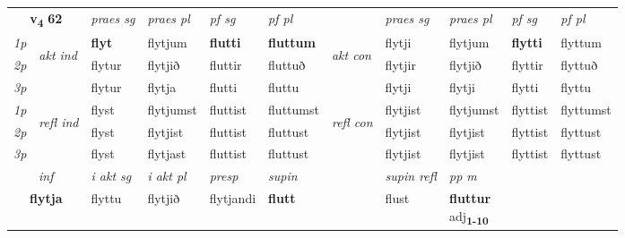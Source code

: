\noindent
\begin{tabular}{lllllllllll} \toprule
\multicolumn{2}{c}{\textbf{v{\textsubscript{4}}} \Large{\textbf{62}}}  &  \textit{praes sg}  & \textit{praes pl}  &\textit{ pf sg} & \textit{pf pl} &  &  \textit{praes sg}  & \textit{praes pl}  & \textit{pf sg} & \textit{pf pl } \\*
	\cmidrule{3-6} \cmidrule{8-11}
 {\textit{1p}} & \multirow{3}{*}{\begin{turn}{90}\textit{akt ind}\end{turn}} & \textbf{flyt} & flytjum & \textbf{flutti} & \textbf{fluttum} & \multirow{3}{*}{\begin{turn}{90}\textit{akt con}\end{turn}} &flytji & flytjum & \textbf{flytti} & flyttum\\*
 {\textit{2p}} &  &  flytur  & flytjið & fluttir & fluttuð & & flytjir & flytjið & flyttir & flyttuð \\*
{\textit{3p}} &  & flytur & flytja & flutti & fluttu & & flytji & flytji& flytti & flyttu \\*
\cmidrule{3-6} \cmidrule{8-11}
 {\textit{1p}} & \multirow{3}{*}{\begin{turn}{90}\textit{refl ind}\end{turn}}  & flyst & flytjumst & fluttist & fluttumst & \multirow{3}{*}{\begin{turn}{90}\textit{refl con}\end{turn}}  &flytjist & flytjumst & flyttist & flyttumst \\*
 {\textit{2p}} &  & flyst & flytjist & fluttist & fluttust & &flytjist & flytjist & flyttist & flyttust \\*
 {\textit{3p}}  & & flyst & flytjast & fluttist & fluttust & & flytjist & flytjist& flyttist & flyttust \\*
\cmidrule{3-6} \cmidrule{8-11}

   \multicolumn{2}{c}{\textit{inf}}  & \textit{i akt sg} & \textit{i akt pl}   & \textit{presp} & \textit{supin} && \textit{supin refl} & \textit{pp m} \\*
  \multicolumn{2}{c}{\textbf{flytja}} & flyttu  & flytjið   & flytjandi &  \textbf{flutt} && flust & \specialcell{\textbf{fluttur} \\ adj\textbf{\textsubscript{1-10}}} \\*
\end{tabular}


